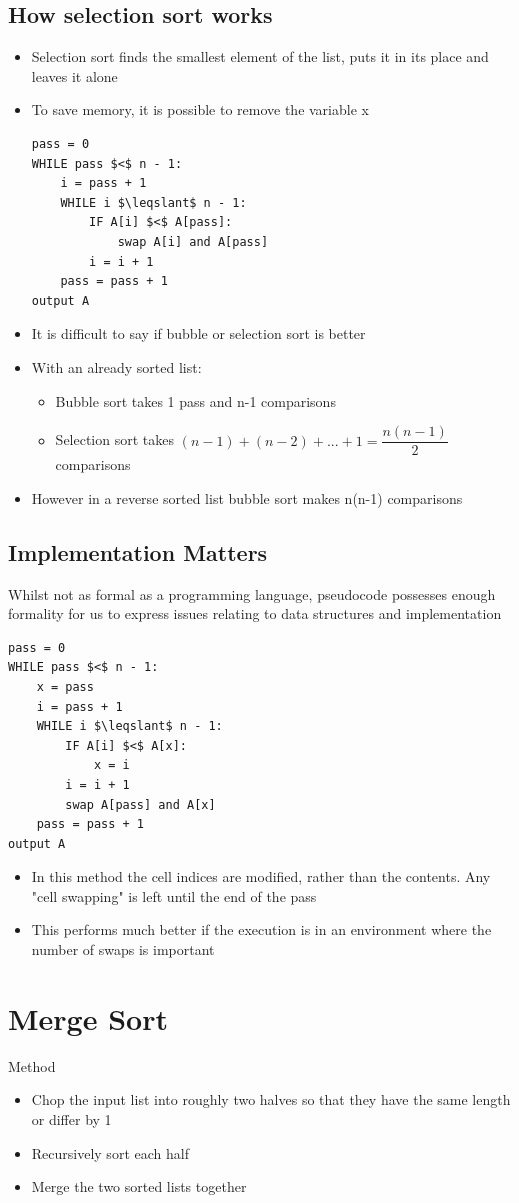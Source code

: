 \documentclass{article}[18pt]
\begin{document}
\subsection{How selection sort works}
\begin{itemize}
	\item Selection sort finds the smallest element of the list, puts it in its place and leaves it alone
	\item To save memory, it is possible to remove the variable x
\begin{lstlisting}[tabsize=4,mathescape]
pass = 0 
WHILE pass $<$ n - 1:
	i = pass + 1 
	WHILE i $\leqslant$ n - 1:
		IF A[i] $<$ A[pass]:
			swap A[i] and A[pass]
		i = i + 1
	pass = pass + 1
output A
\end{lstlisting}
\item It is difficult to say if bubble or selection sort is better
\item With an already sorted list:
\begin{itemize}
	\item Bubble sort takes 1 pass and n-1 comparisons
	\item Selection sort takes $(n-1)+(n-2)+...+1=\dfrac{n(n-1)}{2}$ comparisons
\end{itemize}
\item However in a reverse sorted list bubble sort makes n(n-1) comparisons
\end{itemize}
\subsection{Implementation Matters}
Whilst not as formal as a programming language, pseudocode possesses enough formality for us to express issues relating to data structures and implementation
\begin{lstlisting}[tabsize=4,mathescape]
pass = 0 
WHILE pass $<$ n - 1:
	x = pass 
	i = pass + 1 
	WHILE i $\leqslant$ n - 1:
		IF A[i] $<$ A[x]:
			x = i 
		i = i + 1
		swap A[pass] and A[x]
	pass = pass + 1
output A
\end{lstlisting}
\begin{itemize}
	\item In this method the cell indices are modified, rather than the contents. Any "cell swapping" is left until the end of the pass
	\item This performs much better if the execution is in an environment where the number of swaps is important
\end{itemize}
\section{Merge Sort}
Method
\begin{itemize}
	\item Chop the input list into roughly two halves so that they have the same length or differ by 1
	\item Recursively sort each half
	\item Merge the two sorted lists together
\end{itemize}
\end{document}
